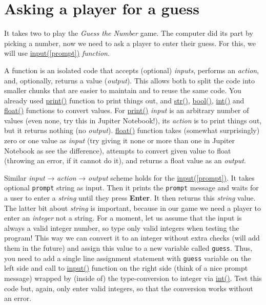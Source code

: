 \documentclass[
]{book}
\begin{document}
\hypertarget{input-function}{%
\section{Asking a player for a guess}\label{input-function}}

It takes two to play the \emph{Guess the Number} game. The computer did its part by picking a number, now we need to ask a player to enter their guess. For this, we will use \href{https://docs.python.org/3/library/functions.html\#input}{input({[}prompt{]})} \emph{function}.

A function is an isolated code that accepts (optional) \emph{inputs}, performs an \emph{action}, and, optionally, returns a value (\emph{output}). This allows both to split the code into smaller chunks that are easier to maintain and to reuse the same code. You already used \href{https://docs.python.org/3/library/functions.html\#print}{print()} function to print things out, and \href{https://docs.python.org/3/library/functions.html\#func-str}{str()}, \href{https://docs.python.org/3/library/functions.html\#bool}{bool()}, \href{https://docs.python.org/3/library/functions.html\#int}{int()} and \href{https://docs.python.org/3/library/functions.html\#float}{float()} functions to convert values. For \href{https://docs.python.org/3/library/functions.html\#print}{print()} \emph{input} is an arbitrary number of values (even none, try this in Jupiter Notebook!), its \emph{action} is to print things out, but it returns nothing (no \emph{output}). \href{https://docs.python.org/3/library/functions.html\#float}{float()} function takes (somewhat surprisingly) zero or one value as \emph{input} (try giving it none or more than one in Jupiter Notebook as see the difference), attempts to convert given value to float (throwing an error, if it cannot do it), and returns a float value as an \emph{output}.

Similar \emph{input} → \emph{action} → \emph{output} scheme holds for the \href{https://docs.python.org/3/library/functions.html\#input}{input({[}prompt{]})}. It takes optional \texttt{prompt} string as input. Then it prints the \texttt{prompt} message and waits for a user to enter a \emph{string} until they press \textbf{Enter}. It then returns this \emph{string} value. The latter bit about \emph{string} is important, because in our game we need a player to enter an \emph{integer} not a string. For a moment, let us assume that the input is always a valid integer number, so type only valid integers when testing the program! This way we can convert it to an integer without extra checks (will add them in the future) and assign this value to a new variable called \texttt{guess}. Thus, you need to add a single line assignment statement with \texttt{guess} variable on the left side and call to \href{https://docs.python.org/3/library/functions.html\#input}{input()} function on the right side (think of a nice prompt message) wrapped by (inside of) the type-conversion to integer via \href{https://docs.python.org/3/library/functions.html\#int}{int()}. Test this code but, again, only enter valid integers, so that the conversion works without an error.
\end{document}
